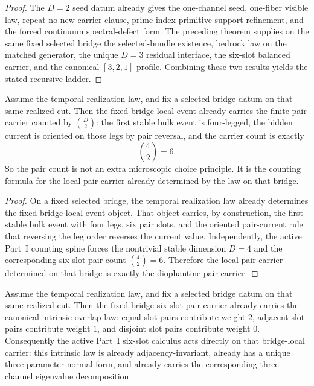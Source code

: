 \begin{proof}
The \(D=2\) seed datum already gives the one-channel seed, one-fiber visible
law, repeat-no-new-carrier clause, prime-index primitive-support refinement,
and the forced continuum spectral-defect form. The preceding theorem supplies
on the same fixed selected bridge the selected-bundle existence, bedrock law on
the matched generator, the unique \(D=3\) residual interface, the six-slot
balanced carrier, and the canonical \([3,2,1]\) profile. Combining these two
results yields the stated recursive ladder.
\end{proof}

\begin{theorem}
\label{thm:temporal-law-realizes-the-diophantine-pair-carrier-on-a-fixed-bridge}
Assume the temporal realization law, and fix a selected bridge datum on that
same realized cut. Then the fixed-bridge local event already carries the finite
pair carrier counted by \(\binom{D}{2}\): the first stable bulk event is
four-legged, the hidden current is oriented on those legs by pair reversal,
and the carrier count is exactly
\[
\binom{4}{2}=6.
\]
So the pair count is not an extra microscopic choice principle. It is the
counting formula for the local pair carrier already determined by the law on
that bridge.
\end{theorem}

\begin{proof}
On a fixed selected bridge, the temporal realization law already determines the
fixed-bridge local-event object. That object carries, by construction, the first
stable bulk event with four legs, six pair slots, and the oriented pair-current
rule that reversing the leg order reverses the current value. Independently,
the active Part~I counting spine forces the nontrivial stable dimension
\(D=4\) and the corresponding six-slot pair count
\(\binom{4}{2}=6\). Therefore the local pair carrier determined on that bridge
is exactly the diophantine pair carrier.
\end{proof}

\begin{theorem}
\label{thm:diophantine-pair-carrier-carries-the-intrinsic-overlap-law-on-a-fixed-bridge}
Assume the temporal realization law, and fix a selected bridge datum on that
same realized cut. Then the fixed-bridge six-slot pair carrier already carries
the canonical intrinsic overlap law: equal slot pairs contribute weight \(2\),
adjacent slot pairs contribute weight \(1\), and disjoint slot pairs
contribute weight \(0\). Consequently the active Part~I six-slot calculus acts
directly on that bridge-local carrier: this intrinsic law is already
adjacency-invariant, already has a unique three-parameter normal form, and
already carries the corresponding three channel eigenvalue decomposition.
\end{theorem}

